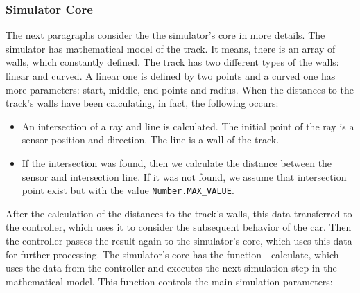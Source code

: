 \subsubsection{Simulator Core}
The next paragraphs consider the the simulator's core in more details. The simulator has mathematical model of the track. It means, there is an array of walls, which constantly defined. The track has two different types of the walls: linear and curved. A linear one is defined by two points and a curved one has more parameters: start, middle, end points and radius. When the distances to the track's walls have been calculating, in fact, the following occurs:
\begin{itemize}
    \item An intersection of a ray and line is calculated. The initial point of the ray is a sensor position and direction. The line is a wall of the track.
    \item If the intersection was found, then we calculate the distance between the sensor and intersection line. If it was not found, we assume that intersection point exist but with the value \texttt{Number.MAX\_VALUE}.
\end{itemize}
After the calculation of the distances to the track's walls, this data transferred to the controller, which uses it to consider the subsequent behavior of the car. Then the controller passes the result again to the simulator's core, which uses this data for further processing. The simulator's core has the function - calculate, which uses the data from the controller and executes the next simulation step in the mathematical model. This function controls the main simulation parameters:

